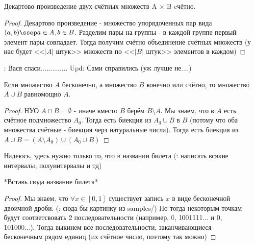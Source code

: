 \begin{theorem} \thmslashn

	Декартово произведение двух счётных множеств A × B cчётно.
	\begin{proof} \thmslashn
	
		Декартово произведение - множество упорядоченных пар вида $(a, b) \ssep a \in A, b \in B$.\newline
		Разделим пары на группы - в каждой группе первый элемент пары совпадает. Тогда получим счётно объединение счётных множеств (у нас будет <<$|A|$ штук>> множеств по <<$|B|$ штук>> элементов в каждом)
	\end{proof}
\end{theorem}


\TODO: Вася спаси.............. \newline
Upd: Сами справились (уж лучше не....) \newline

\begin{theorem} \thmslashn

	Если множество $A$ бесконечно, а множество $B$ конечно или счётно, то множество $A \cup B$ равномощно $A$.
	\begin{proof} \thmslashn
	
		НУО $A \cap B = \emptyset $ - иначе вместо $B$ берём $B \setminus A$. \newline
		Мы знаем, что в $A$ есть счётное подмножество $A_0$. Тогда есть биекция из $A_0 \cup B$ в $B$ (потому что оба множества счётные - биекция черз натуральные числа). Тогда есть биекция из $A \cup B = (A \setminus A_0) \cup (A_0 \cup B)$
	\end{proof}
\end{theorem}

Надеюсь, здесь нужно только то, что в названии билета (\TODO: написать всякие интервалы, полуинтервалы и тд)
\begin{theorem} \thmslashn

	*Вставь сюда название билета*
	\begin{proof} \thmslashn
	
		Мы знаем, что $\forall x \in [0,1]$ существует запись $x$ в виде бесконечной двоичной дроби. (\TODO: сюда бы картинку из samples/) Но тогда некоторым точкам будут соответсвовать 2 последовательности (например, 0, 1001111... и 0, 101000...). Тогда выкинем все последовательности, заканчивающиеся бесконечным рядом единиц (их счётное число, поэтому так можно)
	\end{proof}
\end{theorem}


